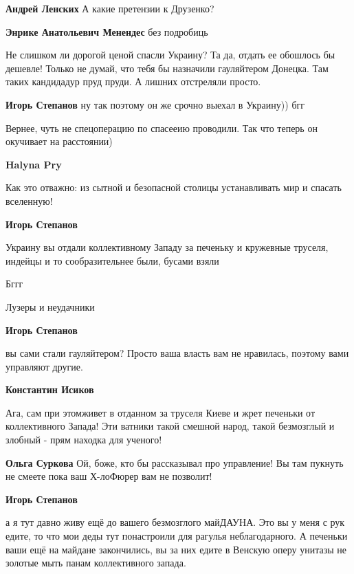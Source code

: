 \begin{itemize}
\begin{itemize} %
\textbf{Андрей Ленских} А какие претензии к Друзенко?

\textbf{Энрике Анатольевич Менендес} без подробиць
\end{itemize} %


Не слишком ли дорогой ценой спасли Украину? Та да, отдать ее обошлось бы
дешевле! Только не думай, что тебя бы назначили гауляйтером Донецка. Там таких
кандидадур пруд пруди. А лишних отстреляли просто.

\begin{itemize} %
\textbf{Игорь Степанов} ну так поэтому он же срочно выехал в Украину)) бгг

Вернее, чуть не спецоперацию по спасееию проводили. Так что теперь он окучивает на расстоянии)

\textbf{Halyna Pry} 

Как это отважно: из сытной и безопасной столицы устанавливать мир и спасать вселенную!

\textbf{Игорь Степанов} 

Украину вы отдали коллективному Западу за печеньку и кружевные труселя, индейцы
и то сообразительнее были, бусами взяли

Бггг

Лузеры и неудачники

\textbf{Игорь Степанов} 

вы сами стали гауляйтером? Просто ваша власть вам не нравилась, поэтому вами управляют другие.

\textbf{Константин Исиков} 

Ага, сам при этомживет в отданном за труселя Киеве и жрет печеньки от
коллективного Запада! Эти ватники такой смешной народ, такой безмозглый и
злобный - прям находка для ученого!

\textbf{Ольга Суркова} Ой, боже, кто бы рассказывал про управление! Вы там пукнуть не смеете пока ваш Х-лоФюрер вам не позволит!

\textbf{Игорь Степанов} 

а я тут давно живу ещё до вашего безмозглого майДАУНА. Это вы у меня с рук
едите, то что мои деды тут понастроили для рагулья неблагодарного. А печеньки
ваши ещё на майдане закончились, вы за них едите в Венскую оперу унитазы не
золотые мыть панам коллективного запада.


\end{itemize}
\end{itemize}
